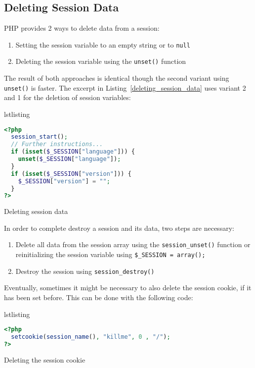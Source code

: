 \documentclass[a4paper, justified, notoc]{tufte-handout} %
\makeatletter
\newenvironment{listing}[1][htbp]
  {\ifvmode\else\unskip\fi\begin{@tufte@float}[#1]{lstlisting}{}}
  {\end{@tufte@float} } %
\makeatother
\begin{document}
\subsection{Deleting Session Data} %
\label{sub:deleting_session_data}
PHP provides 2 ways to delete data from a session:
\begin{enumerate}
	\item Setting the session variable to an empty string or to \texttt{null}
	\item Deleting the session variable using the \texttt{unset()} function
\end{enumerate}
The result of both approaches is identical though the second variant using \texttt{unset()} is faster. 
The excerpt in Listing~\ref{deleting_session_data} uses variant 2 and 1 for the deletion of session variables:
\begin{listing}
\begin{lstlisting}[language=PHP]
<?php
  session_start();
  // Further instructions...
  if (isset($_SESSION["language"])) {
    unset($_SESSION["language"]);
  }
  if (isset($_SESSION["version"])) {
    $_SESSION["version"] = "";
  }
?>
\end{lstlisting}
	\caption{Deleting session data}
	\label{deleting_session_data}
\end{listing}

In order to complete destroy a session and its data, two steps are necessary:
\begin{enumerate}
	\item Delete all data from the session array using the \texttt{session\_unset()} function or reinitializing the session variable using \texttt{\$\_SESSION = array();}
	\item Destroy the session using \texttt{session\_destroy()}
\end{enumerate}

Eventually, sometimes it might be necessary to also delete the session cookie, if it has been set before. 
This can be done with the following code:
\begin{listing}
\begin{lstlisting}[language=PHP]
<?php
  setcookie(session_name(), "killme", 0 , "/");
?>
\end{lstlisting}
	\caption{Deleting the session cookie}
	\label{deleting_session_cookie}
\end{listing}
\end{document}

